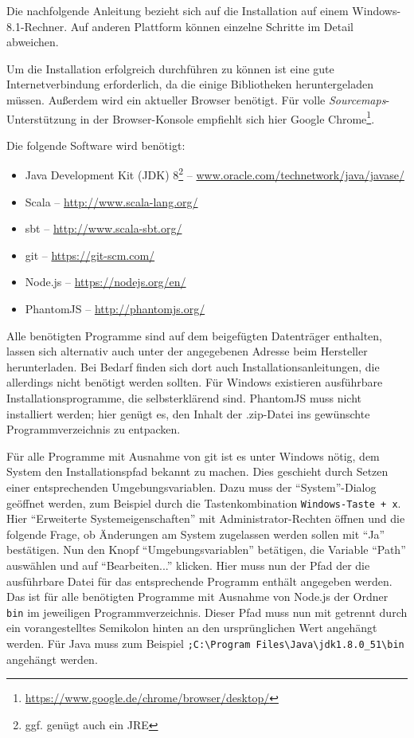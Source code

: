 \documentclass[a4paper, 12pt, hidelinks, listof=totoc, listoftables=totoc, bibliography=totoc]{scrreprt}
\begin{document}

Die nachfolgende Anleitung bezieht sich auf die Installation auf einem Windows-8.1-Rechner. Auf anderen Plattform können einzelne Schritte im Detail abweichen.

Um die Installation erfolgreich durchführen zu können ist eine gute Internetverbindung erforderlich, da die einige Bibliotheken heruntergeladen müssen. Außerdem wird ein aktueller Browser benötigt. Für volle \textit{Sourcemaps}-Unterstützung in der Browser-Konsole empfiehlt sich hier Google Chrome\footnote{\url{https://www.google.de/chrome/browser/desktop/}}.

Die folgende Software wird benötigt:

\begin{itemize}
	\item Java Development Kit (JDK) 8\footnote{ggf. genügt auch ein JRE}  --  \url{www.oracle.com/technetwork/java/javase/}
	\item Scala  --  \url{http://www.scala-lang.org/}
	\item sbt  --  \url{http://www.scala-sbt.org/}
	\item git  --  \url{https://git-scm.com/}
	\item Node.js  --  \url{https://nodejs.org/en/}
	\item PhantomJS  --  \url{http://phantomjs.org/}
\end{itemize}

Alle benötigten Programme sind auf dem beigefügten Datenträger enthalten, lassen sich alternativ auch unter der angegebenen Adresse beim Hersteller herunterladen. Bei Bedarf finden sich dort auch Installationsanleitungen, die allerdings nicht benötigt werden sollten. Für Windows existieren ausführbare Installationsprogramme, die selbsterklärend sind. PhantomJS muss nicht installiert werden; hier genügt es, den Inhalt der .zip-Datei ins gewünschte Programmverzeichnis zu entpacken.

Für alle Programme mit Ausnahme von git ist es unter Windows nötig, dem System den Installationspfad bekannt zu machen. Dies geschieht durch Setzen einer entsprechenden Umgebungsvariablen. Dazu muss der "`System"'-Dialog geöffnet werden, zum Beispiel durch die Tastenkombination \texttt{Windows-Taste + x}. Hier "`Erweiterte Systemeigenschaften"' mit Administrator-Rechten öffnen und die folgende Frage, ob Änderungen am System zugelassen werden sollen mit "`Ja"' bestätigen. Nun den Knopf "`Umgebungsvariablen"' betätigen, die Variable "`Path"' auswählen und auf "`Bearbeiten..."' klicken. Hier muss nun der Pfad der die ausführbare Datei für das entsprechende Programm enthält angegeben werden. Das ist für alle benötigten Programme mit Ausnahme von Node.js der Ordner \texttt{bin} im jeweiligen Programmverzeichnis. Dieser Pfad muss nun mit getrennt durch ein vorangestelltes Semikolon hinten an den ursprünglichen Wert angehängt werden. Für Java muss zum Beispiel \texttt{;C:\textbackslash{}Program Files\textbackslash{}Java\textbackslash{}jdk1.8.0\_51\textbackslash{}bin} angehängt werden.
\end{document}
